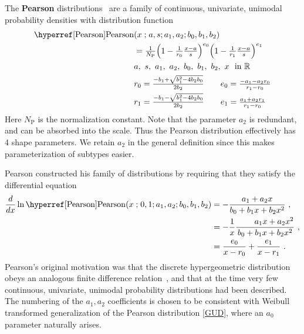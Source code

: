 

\label{sec:Pearson}
{} 
The {\bf Pearson} distributions~\cite{Pearson1895, Pearson1901, Pearson1916, Ord1972, Johnson1994} are a family of continuous, univariate, unimodal probability densities with distribution function
\begin{align}
\label{Pearson}
 \opr{Pearson}&(x\given a, s; a_1, a_2;  b_0, b_1, b_2) 
 \\ \notag
 &=  \tfrac{1}{N_{\text{P}}} \Left(1- \tfrac{1}{r_0}\tfrac{x-a}{s} \Right)^{e_0} \Left(1- \tfrac{1}{r_1}\tfrac{x-a}{s} \Right)^{e_1}
\\ \notag
&  a,\ s,\  a_1,\ a_2,\ b_0,\ b_1,\ b_2,\ x\  \text{ in } \mathbb{R}
\\ \notag
& r_0 = \tfrac{-b_1+\sqrt{b_1^2 - 4b_2b_0} }{2b_2} \checked  \qquad e_0 = \tfrac{-a_1-a_2 r_0}{r_1-r_0} \\
\notag
& r_1 = \tfrac{-b_1-\sqrt{b_1^2 - 4b_2b_0} }{2b_2} \checked \qquad e_1 = \tfrac{a_1+a_2 r_1}{r_1-r_0} 
\end{align}
Here $N_{\text{P}}$ is the normalization constant. Note that the parameter $a_2$  is redundant, and can be absorbed into the scale. Thus the Pearson distribution effectively has 4 shape parameters. We retain $a_2$ in the general definition since this makes parameterization of subtypes easier. 


Pearson constructed his family of distributions by requiring that they satisfy the differential equation
\begin{align*}
\frac{d}{dx} \ln  \opr{Pearson}(x\given 0, 1; a_1, a_2; b_0, b_1, b_2) 
&= - \frac{a_1 + a_2 x  }{b_0+ b_1 x+ b_2 x^2  } \ ,  \checked \\
&= - \frac{1}{x} \frac{\phantom{a_0 + {} } a_1 x + a_2 x^2  }{b_0+ b_1 x+ b_2 x^2  } \ ,  \checked \\
&= \frac{e_0}{x-r_0} + \frac{e_1}{x-r_1} \ . \checked
\end{align*}
Pearson's original motivation was that the discrete hypergeometric distribution obeys an analogous finite difference relation~\cite{Ord1972}, and that at the time very few continuous, univariate, unimodal probability distributions had been described. The numbering of the $a_1, a_2$ coefficients is chosen to be consistent with Weibull transformed generalization of the Pearson distribution \eqref{GUD}, where an $a_0$ parameter naturally arises. 


